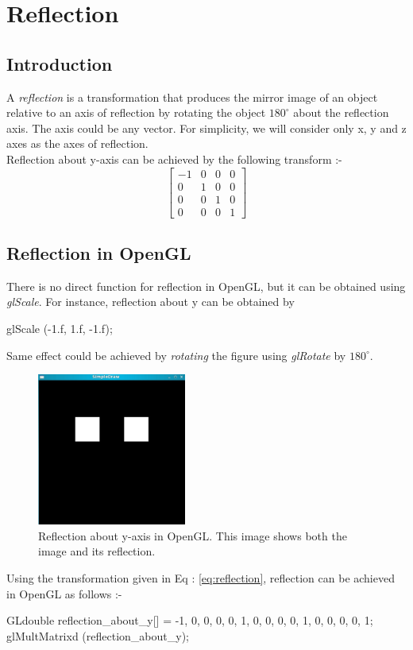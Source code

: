 \documentclass[a4paper,12pt,titlepage,twosided]{article}
\begin{document}
\pagebreak
\section{Reflection}
	\subsection{Introduction}
	A \emph{reflection} is a transformation that produces the mirror image of an object relative to an axis of reflection by rotating the object $180^\circ$ about the reflection axis. The axis could be any vector. For simplicity, we will consider only x, y and z axes as the axes of reflection. 
\\ 
	Reflection about y-axis can be achieved by the following transform :-
	\begin{equation}
		\begin{bmatrix}
			-1 & 0 & 0 & 0 \\
			 0 & 1 & 0 & 0 \\
			 0 & 0 & 1 & 0 \\
			 0 & 0 & 0 & 1
		\end{bmatrix}
		\label{eq:reflection}
	\end{equation}

	\subsection{Reflection in OpenGL}
		There is no direct function for reflection in OpenGL, but it can be obtained using \emph{glScale}. For instance, reflection about y can be obtained by
	\begin{code}
		glScale (-1.f, 1.f, -1.f);
	\end{code}
	Same effect could be achieved by \emph{rotating} the figure using \emph{glRotate} by $180^\circ$.\\
	\begin{figure}[h]
		\centering
		\includegraphics[height=50mm]{Images_final/mirror_along_y.jpg}
		\caption{Reflection about y-axis in OpenGL. This image shows both the image and its reflection.}
		\label{fig:reflection}
	\end{figure}
	Using the transformation given in Eq : \eqref{eq:reflection}, reflection can be achieved in OpenGL as follows :-
	\begin{code}
		GLdouble reflection_about_y[] = {-1, 0, 0, 0,
						  0, 1, 0, 0, 
						  0, 0, 1, 0,
						  0, 0, 0, 1};
		glMultMatrixd (reflection_about_y);
	\end{code}
\end{document}
